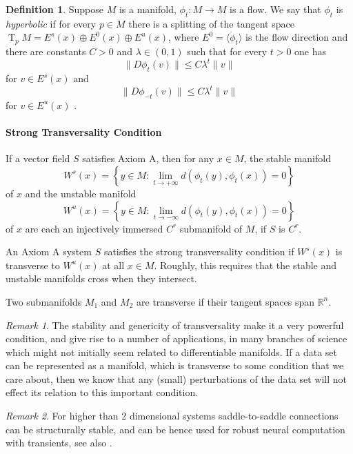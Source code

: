 \documentclass{article}
\theoremstyle{definition} \newtheorem{definition}{Definition}
\theoremstyle{remark} \newtheorem{remark}{Remark}
\newcommand{\T}{\operatorname{T}}
\newcommand{\TpM}{\T_p\!M}
\newcounter{ct}
\begin{document}
\begin{definition}
 Suppose $M$ is a manifold, $\phi_t\colon M\rightarrow M$ is a flow.
  We say that $\phi_t$ is \emph{hyperbolic} %
   if for every $p\in M$ there is a splitting of the tangent space $\TpM=E^s(x)\oplus E^0(x)\oplus E^u(x)$, where $E^0=\langle \dot\phi_t\rangle$ is the flow direction and there are constants $C>0$ and $\lambda\in(0,1)$ such that for every $t>0$ one has \[\|D\phi_t(v)\|\leq C\lambda^t\|v\|\]
for $v\in E^s(x)$ and \[\|D\phi_{-t}(v)\|\leq C\lambda^t\|v\|\] for $v\in E^u(x)$ . 
\end{definition}

\paragraph{Strong Transversality Condition}

If a vector field $S$ satisfies Axiom A, then for any $x \in M$, the stable manifold 
\[W^s(x)=\left\{ y \in M \colon \lim_{t\rightarrow+\infty} d(\phi_t( y), \phi_t(x))=0\right\}\]
of $x$ and the unstable manifold
\[W^u(x)=\left\{ y \in M \colon \lim_{t\rightarrow-\infty} d(\phi_t( y), \phi_t(x))=0\right\}\]
of $x$ are each an injectively immersed $C^r$ submanifold of $M$, if $S$ is $C^r$.

An Axiom A system $S$ satisfies the strong transversality condition if $W^s(x)$ is transverse to $W^u(x)$ at all $x\in M$.
Roughly, this requires that the stable and unstable manifolds cross when they intersect. 

Two submanifolds $M_1$ and $M_2$ are transverse if their tangent spaces span $\mathbb{R}^n$.

\begin{remark}
The stability and genericity of transversality make it a very powerful condition, and give rise to a number of applications, in many branches of science which might not initially seem related to
differentiable manifolds. If a data set can be represented as a manifold, which is transverse to some condition that we care about, then we know that any (small) perturbations of the data set will not effect its relation to this important condition.
\end{remark}


\begin{remark}
For higher than 2 dimensional systems saddle-to-saddle connections can be structurally stable, and can be hence used for robust neural computation with transients, see also \cite{rabinovich2008transient}.
\end{remark}
\end{document}
